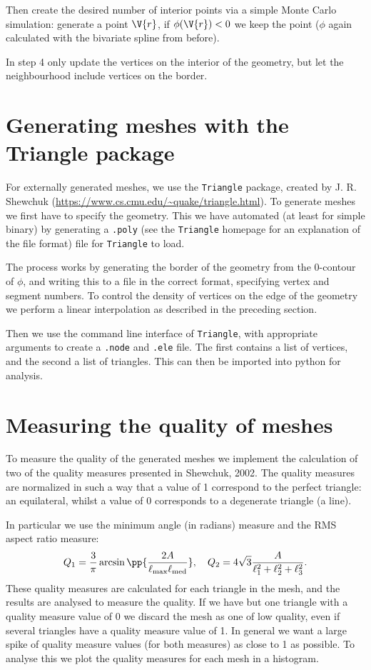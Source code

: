 \documentclass[sigconf]{acmart}
\begin{document}
Then create the desired number of interior points via a simple Monte Carlo simulation: generate a point $ \V{r} $, if $ \phi(\V{r}) < 0 $ we keep the point ($ \phi $ again calculated with the bivariate spline from before).

In step 4 only update the vertices on the interior of the geometry, but let the neighbourhood include vertices on the border.


\section{Generating meshes with the Triangle package}
For externally generated meshes, we use the \texttt{Triangle} package, created by J. R. Shewchuk (\url{https://www.cs.cmu.edu/~quake/triangle.html}). To generate meshes we first have to specify the geometry. This we have automated (at least for simple binary) by generating a \texttt{.poly} (see the \texttt{Triangle} homepage for an explanation of the file format) file for \texttt{Triangle} to load.

The process works by generating the border of the geometry from the 0-contour of $ \phi $, and writing this to a file in the correct format, specifying vertex and segment numbers. To control the density of vertices on the edge of the geometry we perform a linear interpolation as described in the preceding section.

Then we use the command line interface of \texttt{Triangle}, with appropriate arguments to create a \texttt{.node} and \texttt{.ele} file. The first contains a list of vertices, and the second a list of triangles. This can then be imported into python for analysis.



\section{Measuring the quality of meshes}
To measure the quality of the generated meshes we implement the calculation of two of the quality measures presented in Shewchuk, 2002. The quality measures are normalized in such a way that a value of 1 correspond to the perfect triangle: an equilateral, whilst a value of 0 corresponds to a degenerate triangle (a line).

In particular we use the minimum angle (in radians) measure and the RMS aspect ratio measure:
\begin{equation}\label{key}
	Q_1 = \frac{3}{\pi} \arcsin\pp{\frac{2A}{\ell_{\text{max}} \ell_{\text{med}}}}, \quad Q_2 = 4 \sqrt{3} \frac{A}{\ell_1^2 + \ell_2^2 + \ell_3^2}. 
\end{equation}
These quality measures are calculated for each triangle in the mesh, and the results are analysed to measure the quality. If we have but one triangle with a quality measure value of 0 we discard the mesh as one of low quality, even if several triangles have a quality measure value of 1. In general we want a large spike of quality measure values (for both measures) as close to 1 as possible. To analyse this we plot the quality measures for each mesh in a histogram.
\end{document}

